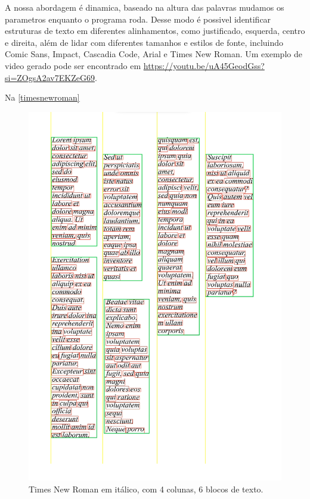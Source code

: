 \documentclass[english, 
               brazil, 
               bsc] %
               {dcomp-abntex2}
\begin{document}
A nossa abordagem é dinamica, baseado na altura das palavras mudamos os parametros enquanto o programa roda. Desse modo é possivel identificar estruturas de texto em diferentes alinhamentos, como justificado, esquerda, centro e direita, além de lidar com diferentes tamanhos e estilos de fonte, incluindo Comic Sans, Impact, Cascadia Code, Arial e Times New Roman. Um exemplo de video gerado pode ser encontrado em \url{https://youtu.be/uA45GeodGss?si=ZOgsA2av7EKZeG69}.

Na \autoref{timesnewroman}
\begin{figure}[h]
        \caption{\label{timesnewroman} \small Times New Roman em itálico, com 4 colunas, 6 blocos de texto.}
        \begin{center}
            \includegraphics[scale=0.5]{./images/times_new_roman_italic_columns.png}
        \end{center}
\end{figure}
\end{document}
